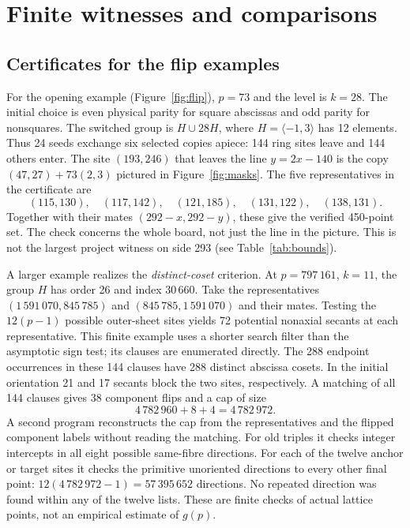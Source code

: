\section{Finite witnesses and comparisons}\label{sec:finite}
\subsection{Certificates for the flip examples}
For the opening example (Figure~\ref{fig:flip}), $p=73$ and the level is $k=28$. The initial choice is even physical parity for square abscissas and odd parity for nonsquares. The switched group is $H\cup28H$, where $H=\langle-1,3\rangle$ has 12 elements. Thus 24 seeds exchange six selected copies apiece: 144 ring sites leave and 144 others enter. The site $(193,246)$ that leaves the line $y=2x-140$ is the copy $(47,27)+73(2,3)$ pictured in Figure~\ref{fig:masks}. The five representatives in the certificate are
\[
 (115,130),\quad(117,142),\quad(121,185),\quad(131,122),\quad(138,131).
\]
Together with their mates $(292-x,292-y)$, these give the verified 450-point set. The check concerns the whole board, not just the line in the picture. This is not the largest project witness on side 293 (see Table~\ref{tab:bounds}).

A larger example realizes the \emph{distinct-coset} criterion. At $p=797\,161$, $k=11$, the group $H$ has order 26 and index $30\,660$. Take the representatives $(1\,591\,070,845\,785)$ and $(845\,785,1\,591\,070)$ and their mates. Testing the $12(p-1)$ possible outer-sheet sites yields 72 potential nonaxial secants at each representative. This finite example uses a shorter search filter than the asymptotic sign test; its clauses are enumerated directly. The 288 endpoint occurrences in these 144 clauses have 288 distinct abscissa cosets. In the initial orientation 21 and 17 secants block the two sites, respectively. A matching of all 144 clauses gives 38 component flips and a cap of size
\[
 4\,782\,960+8+4=4\,782\,972.
\]
A second program reconstructs the cap from the representatives and the flipped component labels without reading the matching. For old triples it checks integer intercepts in all eight possible same-fibre directions. For each of the twelve anchor or target sites it checks the primitive unoriented directions to every other final point: $12(4\,782\,972-1)=57\,395\,652$ directions. No repeated direction was found within any of the twelve lists. These are finite checks of actual lattice points, not an empirical estimate of $g(p)$.

